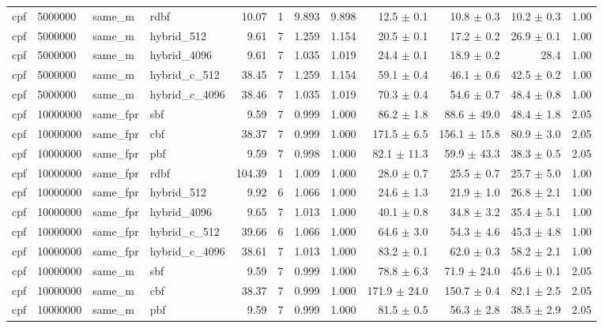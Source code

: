 \begin{tabular}{llllrrrrrrrr}
cpf & 5000000 & same\_m & rdbf & 10.07 & 1 & 9.893 & 9.898 & 12.5 $\pm$ 0.1 & 10.8 $\pm$ 0.3 & 10.2 $\pm$ 0.3 & 1.00 \\
cpf & 5000000 & same\_m & hybrid\_512 & 9.61 & 7 & 1.259 & 1.154 & 20.5 $\pm$ 0.1 & 17.2 $\pm$ 0.2 & 26.9 $\pm$ 0.1 & 1.00 \\
cpf & 5000000 & same\_m & hybrid\_4096 & 9.61 & 7 & 1.035 & 1.019 & 24.4 $\pm$ 0.1 & 18.9 $\pm$ 0.2 & 28.4 & 1.00 \\
cpf & 5000000 & same\_m & hybrid\_c\_512 & 38.45 & 7 & 1.259 & 1.154 & 59.1 $\pm$ 0.4 & 46.1 $\pm$ 0.6 & 42.5 $\pm$ 0.2 & 1.00 \\
cpf & 5000000 & same\_m & hybrid\_c\_4096 & 38.46 & 7 & 1.035 & 1.019 & 70.3 $\pm$ 0.4 & 54.6 $\pm$ 0.7 & 48.4 $\pm$ 0.8 & 1.00 \\
cpf & 10000000 & same\_fpr & sbf & 9.59 & 7 & 0.999 & 1.000 & 86.2 $\pm$ 1.8 & 88.6 $\pm$ 49.0 & 48.4 $\pm$ 1.8 & 2.05 \\
cpf & 10000000 & same\_fpr & cbf & 38.37 & 7 & 0.999 & 1.000 & 171.5 $\pm$ 6.5 & 156.1 $\pm$ 15.8 & 80.9 $\pm$ 3.0 & 2.05 \\
cpf & 10000000 & same\_fpr & pbf & 9.59 & 7 & 0.998 & 1.000 & 82.1 $\pm$ 11.3 & 59.9 $\pm$ 43.3 & 38.3 $\pm$ 0.5 & 2.05 \\
cpf & 10000000 & same\_fpr & rdbf & 104.39 & 1 & 1.009 & 1.000 & 28.0 $\pm$ 0.7 & 25.5 $\pm$ 0.7 & 25.7 $\pm$ 5.0 & 1.00 \\
cpf & 10000000 & same\_fpr & hybrid\_512 & 9.92 & 6 & 1.066 & 1.000 & 24.6 $\pm$ 1.3 & 21.9 $\pm$ 1.0 & 26.8 $\pm$ 2.1 & 1.00 \\
cpf & 10000000 & same\_fpr & hybrid\_4096 & 9.65 & 7 & 1.013 & 1.000 & 40.1 $\pm$ 0.8 & 34.8 $\pm$ 3.2 & 35.4 $\pm$ 5.1 & 1.00 \\
cpf & 10000000 & same\_fpr & hybrid\_c\_512 & 39.66 & 6 & 1.066 & 1.000 & 64.6 $\pm$ 3.0 & 54.3 $\pm$ 4.6 & 45.3 $\pm$ 4.8 & 1.00 \\
cpf & 10000000 & same\_fpr & hybrid\_c\_4096 & 38.61 & 7 & 1.013 & 1.000 & 83.2 $\pm$ 0.1 & 62.0 $\pm$ 0.3 & 58.2 $\pm$ 2.1 & 1.00 \\
cpf & 10000000 & same\_m & sbf & 9.59 & 7 & 0.999 & 1.000 & 78.8 $\pm$ 6.3 & 71.9 $\pm$ 24.0 & 45.6 $\pm$ 0.1 & 2.05 \\
cpf & 10000000 & same\_m & cbf & 38.37 & 7 & 0.999 & 1.000 & 171.9 $\pm$ 24.0 & 150.7 $\pm$ 0.4 & 82.1 $\pm$ 2.5 & 2.05 \\
cpf & 10000000 & same\_m & pbf & 9.59 & 7 & 0.999 & 1.000 & 81.5 $\pm$ 0.5 & 56.3 $\pm$ 2.8 & 38.5 $\pm$ 2.9 & 2.05 \\

\end{tabular}
